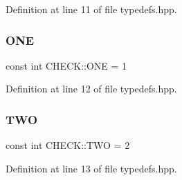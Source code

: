 Definition at line 11 of file typedefs.\+hpp.

\mbox{\label{namespace_c_h_e_c_k_acf8ecf93ddfb75456112712630f8f722}} 
\subsubsection{\texorpdfstring{O\+NE}{ONE}}
{\footnotesize\ttfamily const int C\+H\+E\+C\+K\+::\+O\+NE = 1}



Definition at line 12 of file typedefs.\+hpp.

\mbox{\label{namespace_c_h_e_c_k_a2b112aaec4c59311376a5a60f291aa48}} 
\subsubsection{\texorpdfstring{T\+WO}{TWO}}
{\footnotesize\ttfamily const int C\+H\+E\+C\+K\+::\+T\+WO = 2}



Definition at line 13 of file typedefs.\+hpp.

